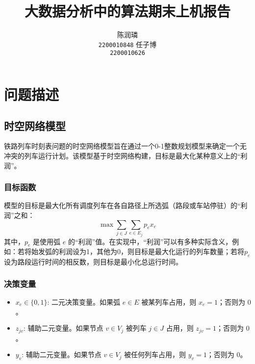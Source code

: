 \documentclass{article}
\title{大数据分析中的算法期末上机报告}
\author{%
    \large 陈润璘 \\
    \large \texttt{2200010848}
    \And
    \large 任子博 \\
    \large \texttt{2200010626}
}
\begin{document}
\maketitle

\section{问题描述}

\subsection{时空网络模型}

铁路列车时刻表问题的时空网络模型旨在通过一个0-1整数规划模型来确定一个无冲突的列车运行计划。该模型基于时空网络构建，目标是最大化某种意义上的“利润”。
\subsubsection{目标函数}
模型的目标是最大化所有调度列车在各自路径上所选弧（路段或车站停驻）的“利润”之和：
\begin{equation}
    \max \sum_{j \in J} \sum_{e \in E_j} p_e x_e\label{eq:obj}
\end{equation}
其中，$p_e$ 是使用弧 $e$
的“利润”值。在实现中，“利润”可以有多种实际含义，例如：若将始发弧的利润设为1，其他为0，则目标是最大化运行的列车数量；若将$p_e$设为路段运行时间的相反数，则目标是最小化总运行时间。

\subsubsection{决策变量}
\begin{itemize}
    \item $x_e \in \{0,1\}$: 二元决策变量。如果弧 $e \in E$ 被某列车占用，则 $x_e = 1$；否则为 $0$。
    \item $z_{jv}$: 辅助二元变量。如果节点 $v \in V_j$ 被列车 $j \in J$ 占用，则
        $z_{jv} = 1$；否则为 $0$。
    \item $y_v$: 辅助二元变量。如果节点 $v \in V_j$ 被任何列车占用，则 $y_v = 1$；否则为 $0$。
\end{itemize}
\end{document}
